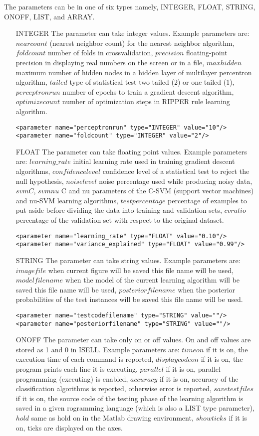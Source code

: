 \documentclass[a4paper,12pt]{book}
\begin{document}
The parameters can be in one of six types namely, INTEGER, FLOAT, STRING, ONOFF, LIST, and ARRAY.
\begin{itemize}
\item[INTEGER] The parameter can take integer values. Example parameters are: $nearcount$ (nearest neighbor count) for the nearest neighbor algorithm, $foldcount$ number of folds in crossvalidation, $precision$ floating-point precision in displaying real numbers on the screen or in a file, $maxhidden$ maximum number of hidden nodes in a hidden layer of multilayer percentron algorithm, $tailed$ type of statistical test two tailed (2) or one tailed (1), $perceptronrun$ number of epochs to train a gradient descent algorithm, $optimizecount$ number of optimization steps in RIPPER rule learning algorithm.
\begin{verbatim}
<parameter name="perceptronrun" type="INTEGER" value="10"/>
<parameter name="foldcount" type="INTEGER" value="2"/>
\end{verbatim}
\item[FLOAT] The parameter can take floating point values. Example parameters are: $learning\_rate$ initial learning rate used in training gradient descent algorithms, $confidencelevel$ confidence level of a statistical test to reject the null hypothesis, $noiselevel$ noise percentage used while producing noisy data, $svmC$, $svmnu$ C and nu parameters of the C-SVM (support vector machines) and nu-SVM learning algorithms, $testpercentage$ percentage of examples to put aside before dividing the data into training and validation sets, $cvratio$ percentage of the validation set with respect to the original dataset.
\begin{verbatim}
<parameter name="learning_rate" type="FLOAT" value="0.10"/>
<parameter name="variance_explained" type="FLOAT" value="0.99"/>
\end{verbatim}
\item[STRING] The parameter can take string values. Example parameters are: $imagefile$ when current figure will be saved this file name will be used, $modelfilename$ when the model of the current learning algorithm will be saved this file name will be used, $posteriorfilename$ when the posterior probabilities of the test instances will be saved this file name will be used.
\begin{verbatim}
<parameter name="testcodefilename" type="STRING" value=""/>
<parameter name="posteriorfilename" type="STRING" value=""/>
\end{verbatim}
\item[ONOFF] The parameter can take only on or off values. On and off values are stored as 1 and 0 in ISELL. Example parameters are: $timeon$ if it is on, the execution time of each command is reported, $displaycodeon$ if it is on, the program prints each line it is executing, $parallel$ if it is on, parallel programming (executing) is enabled, $accuracy$ if it is on, accuracy of the classification algorithms is reported, otherwise error is reported, $savetestfiles$ if it is on, the source code of the testing phase of the learning algorithm is saved in a given rogramming language (which is also a LIST type parameter), $hold$ same as hold on in the Matlab drawing environment, $showticks$ if it is on, ticks are displayed on the axes.

\end{itemize}
\end{document}
